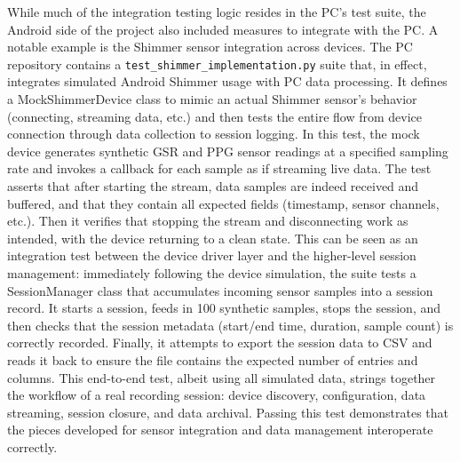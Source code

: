 \documentclass[11pt,a4paper]{report}
\begin{document}
While much of the integration testing logic resides in the PC's test suite, the Android side of the project also included measures to integrate with the PC. A notable example is the Shimmer sensor integration across devices. The PC repository contains a \texttt{test\_shimmer\_implementation.py} suite that, in effect, integrates simulated Android Shimmer usage with PC data processing. It defines a MockShimmerDevice class to mimic an actual Shimmer sensor's behavior (connecting, streaming data, etc.) and then tests the entire flow from device connection through data collection to session logging. In this test, the mock device generates synthetic GSR and PPG sensor readings at a specified sampling rate and invokes a callback for each sample as if streaming live data. The test asserts that after starting the stream, data samples are indeed received and buffered, and that they contain all expected fields (timestamp, sensor channels, etc.). Then it verifies that stopping the stream and disconnecting work as intended, with the device returning to a clean state. This can be seen as an integration test between the device driver layer and the higher-level session management: immediately following the device simulation, the suite tests a SessionManager class that accumulates incoming sensor samples into a session record. It starts a session, feeds in 100 synthetic samples, stops the session, and then checks that the session metadata (start/end time, duration, sample count) is correctly recorded. Finally, it attempts to export the session data to CSV and reads it back to ensure the file contains the expected number of entries and columns. This end-to-end test, albeit using all simulated data, strings together the workflow of a real recording session: device discovery, configuration, data streaming, session closure, and data archival. Passing this test demonstrates that the pieces developed for sensor integration and data management interoperate correctly.
\end{document}
